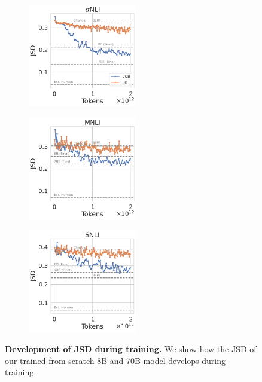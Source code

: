 \begin{figure}[t]
    \begin{subfigure}[b]{0.32\textwidth}
        \includegraphics[height=4.5cm]{figures/abductivenli_intermediate_jsd}
        \caption{}
    \end{subfigure}
    \begin{subfigure}[b]{0.32\textwidth}
        \includegraphics[height=4.5cm, trim=11mm 0 0 0, clip]{figures/mnli_matched_intermediate_jsd}
        \caption{}
    \end{subfigure}
    \begin{subfigure}[b]{0.32\textwidth}
        \includegraphics[height=4.5cm, trim=11mm 0 0 0, clip]{figures/snli_intermediate_jsd}
        \caption{}
    \end{subfigure}
    \caption{\textbf{Development of JSD during training.} We show how the JSD of our trained-from-scratch 8B and 70B model develops during training.}\label{fig:jsd_training}
\end{figure}

